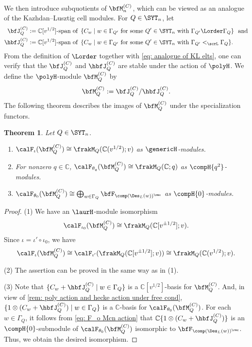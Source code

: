 \documentclass[12pt, reqno]{amsart}
\theoremstyle{plain}
\newtheorem{theorem}{Theorem}[section]
\theoremstyle{definition}
\numberwithin{equation}{section}
\numberwithin{figure}{section}
\numberwithin{table}{section}
\def\C{\mathbb C}
\begin{document}
We then introduce  subquotients of $\bfM^{(C)}_n$, which can be viewed as an analogue of the Kazhdan--Lusztig cell modules.
For $Q \in \SYT_n$, let
\begin{align*}
\bfJ^{(C)}_Q
&:= \C[v^{1/2}]\text{-span of } \, \{C_w \mid  \text{$w \in \Gamma_{Q'}$ for some $Q' \in \SYT_n$ with $\Gamma_{Q'} \Lorder \Gamma_Q$} \}\ \  \text{and}  \\
\hbfJ^{(C)}_Q
&:= \C[v^{1/2}]\text{-span of } \,  \{C_w \mid  \text{$w \in \Gamma_{Q'}$ for some $Q' \in \SYT_n$ with $\Gamma_{Q'} <_{\scrL} \Gamma_Q$} \}.
\end{align*}
From the definition of $\Lorder$ together with \cref{eq: analogue of KL elts}, one can verify that the $\bfJ^{(C)}_Q$ and $\hbfJ^{(C)}_Q$ are stable under the action of $\polyH$.
We define the $\polyH$-module $\bfM^{(C)}_Q$ by
\begin{align}\label{eq: def of bfMCQ}
\bfM^{(C)}_Q := \bfJ^{(C)}_Q / \hbfJ^{(C)}_Q.
\end{align}
The following theorem describes the images of $\bfM^{(C)}_Q$ under the specialization functors.

\begin{theorem}\label{thm: KL cell module C basis}
Let  $Q \in \SYT_n$.
\begin{enumerate}[label = {\rm (\arabic*)}]
\item 
$\calF_{\iota}(\bfM^{(C)}_Q) \cong \frakM_Q(\C(v^{1/2});v)$
as $\genericH$-modules.
\item 
For nonzero $q \in \C$, $\calF_{\theta_q}(\bfM^{(C)}_Q) \cong \frakM_Q(\C;q)$ as $\compH{q^2}$-modules.
\item 
$\calF_{\theta_0}(\bfM^{(C)}_Q) \cong \bigoplus_{w \in \Gamma_Q}  \bfF_{\comp(\Des_L(w))^\rmc}$ as $\compH{0}$-modules.
\end{enumerate} 
\end{theorem}
\begin{proof}
(1)  We have an $\laurH$-module isomorphism
\begin{align*}
\calF_{\iota_0}(\bfM^{(C)}_Q) \cong \frakM_Q(\C[v^{\pm 1/2}];v).
\end{align*}
Since $\iota = \iota' \circ \iota_0$, we have 
\[
\calF_{\iota}(\bfM^{(C)}_Q) \cong \calF_{\iota'}(\frakM_Q(\C[v^{\pm 1/2}];v)) \cong \frakM_Q(\C(v^{1/2});v).
\]

(2) The assertion can be proved in the same way as in (1).

(3) Note that  $\{C_w + \hbfJ^{(C)}_Q \mid w \in \Gamma_Q \}$ is a $\C[v^{1/2}]$-basis for $\bfM^{(C)}_Q$.
And, in view of \cref{rem: poly action and hecke action under free cond}, $\{1 \otimes (C_w + \hbfJ^{(C)}_Q) \mid w \in \Gamma_Q \}$ is a $\C$-basis for $\calF_{\theta_0}(\bfM^{(C)}_Q)$.
For each $w \in \Gamma_Q$, it follows from \cref{eq: F_o Mcn action} that  $\C \{1 \otimes (C_w + \hbfJ^{(C)}_Q) \}$ is an $\compH{0}$-submodule of $\calF_{\theta_0}(\bfM^{(C)}_Q)$ isomorphic to $\bfF_{\comp(\Des_L(w))^\rmc}$.
Thus, we obtain the desired isomorphism.
\end{proof}
\end{document}
